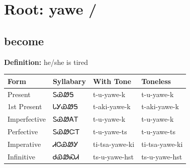 \documentclass{article}%
\begin{document}
%
\normalsize%
\section*{Root: yawe / }%
\subsection*{become}%
\textbf{Definition: }%
he/she is tired%
\\[0.5em]%
\begin{tabular}{|l|l|l|l|}%
\hline%
\textbf{Form}&\textbf{Syllabary}&\textbf{With Tone}&\textbf{Toneless}\\%
\hline%
Present&ᏚᏯᏪᎦ&t{-}u{-}yawe{-}k&t{-}u{-}yawe{-}k\\%
1st Present&ᏓᎩᏯᏪᎦ&t{-}aki{-}yawe{-}k&t{-}aki{-}yawe{-}k\\%
Imperfective&ᏚᏯᏪᎪᎢ&t{-}u{-}yawe{-}k&t{-}u{-}yawe{-}k\\%
Perfective&ᏚᏯᏪᏨᎢ&t{-}u{-}yawe{-}ts&t{-}u{-}yawe{-}ts\\%
Imperative&ᏗᏣᏯᏪᎩ&ti{-}tsa{-}yawe{-}ki&ti{-}tsa{-}yawe{-}ki\\%
Infinitive&ᏧᏯᏪᏍᏗ&ts{-}u{-}yawe{-}hst&ts{-}u{-}yawe{-}hst\\%
\hline%
\end{tabular}%
\\[1em]%
\end{document}
